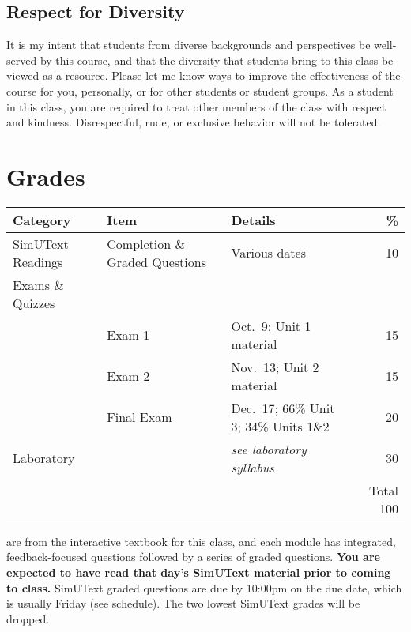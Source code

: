 \documentclass{tufte-handout}
\begin{document}
\begin{fullwidth}
\subsection{Respect for Diversity}

It is my intent that students from diverse backgrounds and perspectives be well-served by this course, and that the diversity that students bring to this class be viewed as a resource. Please let me know ways to improve the effectiveness of the course for you, personally, or for other students or student groups. As a student in this class, you are required to treat other members of the class with respect and kindness. Disrespectful, rude, or exclusive behavior will not be tolerated.

\section{Grades}


\begin{table}
\begin{tabular}{l l l r}
Category & Item & Details & \% \\
\hline
SimUText Readings & Completion \& Graded Questions & Various dates & 10\\
\hline
Exams \& Quizzes \\
& Exam 1 & Oct.~9; Unit 1 material & 15 \\
& Exam 2 & Nov.~13; Unit 2 material & 15 \\
& Final Exam & Dec.~17; 66\% Unit 3; 34\% Units 1\&2 & 20 \\ 							%
\hline
Laboratory & & \emph{see laboratory syllabus} & 30 \\
\hline
& & & Total 100
\end{tabular}
\end{table}

\end{fullwidth}

 are from the interactive textbook for this class, and each module has integrated, feedback-focused questions followed by a series of graded questions. \textbf{You are expected to have read that day's SimUText material prior to coming to class. } SimUText graded questions are due by 10:00pm on the due date, which is usually Friday (see schedule). The two lowest SimUText grades will be dropped.
\end{document}
